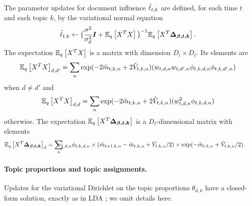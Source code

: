 The parameter updates for document influence $\tilde{\ell}_{t,k}$ are
defined, for each time $t$ and each topic $k$, by the
variational normal equation
\begin{align}
\tilde{\ell}_{t, k} \gets \big(  \frac{\sigma^2}{\sigma^2_{d}} \bm I
  + \mathbb{E}_q\left[X^T X\right] \big)^{-1} \mathbb{E}_q\left[X^T \bm{\Delta_{\beta,t,k}}\right].
  \label{eq:regression}
\end{align}
The expectation $\mathbb{E}_q\left[X^TX\right]$ is a matrix with dimension $D_t \times D_t$.  Its elements are
\begin{eqnarray*}
 {\mathbb{E}_q\left[X^T X\right]}_{d,d'} = \sum_n \exp(-2\tilde{m}_{t,k,n} + 2 \tilde{V}_{t,k,n}) (w_{t,d,n} w_{t,d',n} \phi_{t,k,d,n } \phi_{t,k,d',n})
\end{eqnarray*}
when $d \neq d'$ and
\begin{eqnarray*}
{\mathbb{E}_q\left[X^T X\right]}_{d,d} = \sum_n \exp(-2\tilde{m}_{t,k,n} + 2 \tilde{V}_{t,k,n}) (w_{t,d,n}^2 \phi_{t,k,d,n})
\end{eqnarray*}
otherwise. The expectation $\mathbb{E}_q\left[X^T \bm{\Delta_{\beta,t,k}}\right]$
is a $D_t$-dimensional matrix with elements
\begin{eqnarray*}
 {\expectq{X^T \bm{\Delta_{\beta,t,k}}}}_d = 
 \sum_n & \hspace{-10pt} w_{t,d,n} \phi_{t,k,d,n} 
  \times (\mv_{t+1,k,n} - \mv_{t,k,n} + \vv_{t,k,n}/2) 
  \times \exp(-\mv_{t,k,n} + \vv_{t,k,n}/2). 
\end{eqnarray*}

\paragraph{Topic proportions and topic assignments.}
Updates for the variational Dirichlet on the topic proportions
$\theta_{d,k}$ have a closed-form solution, exactly as in LDA
\citep{blei:2003}; we omit details here.


